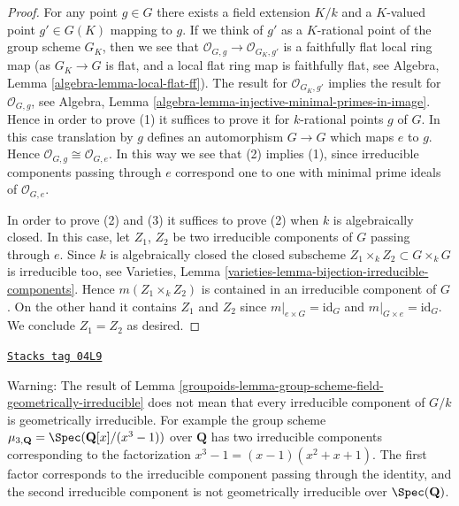 \begin{proof}
For any point $g \in G$ there exists a field extension
$K/k$ and a $K$-valued point $g' \in G(K)$ mapping to
$g$. If we think of $g'$ as a $K$-rational point of the
group scheme $G_K$, then we see that
$\mathcal{O}_{G, g} \to \mathcal{O}_{G_K, g'}$ is a faithfully flat
local ring map (as $G_K \to G$ is flat, and a local flat ring map
is faithfully flat, see
Algebra, Lemma \ref{algebra-lemma-local-flat-ff}).
The result for $\mathcal{O}_{G_K, g'}$ implies the
result for $\mathcal{O}_{G, g}$, see
Algebra, Lemma \ref{algebra-lemma-injective-minimal-primes-in-image}.
Hence in order to prove (1) it suffices to
prove it for $k$-rational points $g$ of $G$. In this case
translation by $g$ defines an automorphism $G \to G$
which maps $e$ to $g$. Hence $\mathcal{O}_{G, g} \cong \mathcal{O}_{G, e}$.
In this way we see that (2) implies (1), since irreducible components
passing through $e$ correspond one to one with minimal prime ideals
of $\mathcal{O}_{G, e}$.

\medskip\noindent
In order to prove (2) and (3) it suffices to prove (2) when $k$
is algebraically closed. In this case, let $Z_1$, $Z_2$ be two
irreducible components of $G$ passing through $e$.
Since $k$ is algebraically closed the closed subscheme
$Z_1 \times_k Z_2 \subset G \times_k G$ is irreducible too, see
Varieties, Lemma \ref{varieties-lemma-bijection-irreducible-components}.
Hence $m(Z_1 \times_k Z_2)$ is contained in an irreducible
component of $G$. On the other hand it contains
$Z_1$ and $Z_2$ since $m|_{e \times G} = \text{id}_G$ and
$m|_{G \times e} = \text{id}_G$. We conclude $Z_1 = Z_2$ as desired.
\end{proof}

\begin{remark}
\label{groupoids-remark-warning-group-scheme-geometrically-irreducible}
\href{https://stacks.math.columbia.edu/tag/04L9}{\texttt{Stacks tag 04L9}}

Warning: The result of
Lemma \ref{groupoids-lemma-group-scheme-field-geometrically-irreducible}
does not mean that every irreducible component of $G/k$ is
geometrically irreducible. For example the group scheme
$\mu_{3, \mathbf{Q}} = \Spec(\mathbf{Q}[x]/(x^3 - 1))$
over $\mathbf{Q}$ has two irreducible components corresponding
to the factorization $x^3 - 1 = (x - 1)(x^2 + x + 1)$.
The first factor corresponds to the irreducible component
passing through the identity, and the second irreducible component
is not geometrically irreducible over $\Spec(\mathbf{Q})$.
\end{remark}

